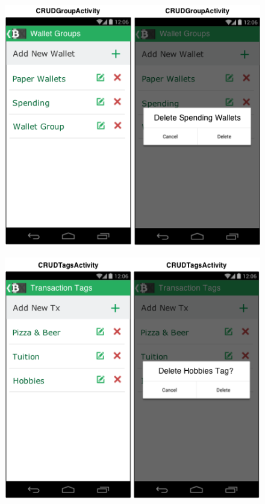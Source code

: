   \begin{figure}[H]
    \includegraphics[width=1.0\textwidth]{../diagrams/storyboard_CRUDgroupTag_1.png}
  \end{figure}
  \begin{figure}[H]
    \includegraphics[width=1.0\textwidth]{../diagrams/storyboard_CRUDgroupTag_2.png}
  \end{figure}

